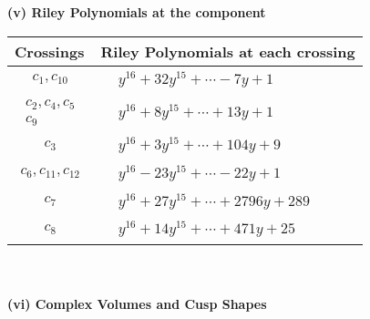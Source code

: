 \documentclass[1p]{elsarticle_modified}
\theoremstyle{definition}
\begin{document}
\newpage\renewcommand{\arraystretch}{1}
\flushleft \textbf{(v) Riley Polynomials at the component}\newline \\
\begin{tabular}{m{50pt}|m{274pt}}
Crossings & \hspace{64pt}Riley Polynomials at each crossing \\
\hline $$\begin{aligned}c_{1},c_{10}\end{aligned}$$&$\begin{aligned}
&y^{16}+32 y^{15}+\cdots-7 y+1
\end{aligned}$\\
\hline $$\begin{aligned}c_{2},c_{4},c_{5}\\c_{9}\end{aligned}$$&$\begin{aligned}
&y^{16}+8 y^{15}+\cdots+13 y+1
\end{aligned}$\\
\hline $$\begin{aligned}c_{3}\end{aligned}$$&$\begin{aligned}
&y^{16}+3 y^{15}+\cdots+104 y+9
\end{aligned}$\\
\hline $$\begin{aligned}c_{6},c_{11},c_{12}\end{aligned}$$&$\begin{aligned}
&y^{16}-23 y^{15}+\cdots-22 y+1
\end{aligned}$\\
\hline $$\begin{aligned}c_{7}\end{aligned}$$&$\begin{aligned}
&y^{16}+27 y^{15}+\cdots+2796 y+289
\end{aligned}$\\
\hline $$\begin{aligned}c_{8}\end{aligned}$$&$\begin{aligned}
&y^{16}+14 y^{15}+\cdots+471 y+25
\end{aligned}$\\
\hline
\end{tabular}\\~\\
\newpage\flushleft \textbf{(vi) Complex Volumes and Cusp Shapes}
\end{document}
